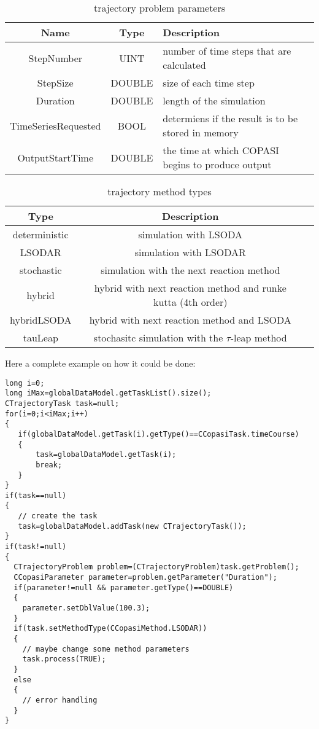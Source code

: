 \documentclass[a4,12pt]{article}
\begin{document}
\begin{table}[ht]
\begin{tabular}{c|c|l}
Name & Type & Description \\ \hline \hline
StepNumber & UINT & number of time steps that are calculated \\ \hline
StepSize & DOUBLE & size of each time step \\ \hline
Duration & DOUBLE & length of the simulation \\ \hline
TimeSeriesRequested & BOOL & determiens if the result is to be stored in memory \\ \hline
OutputStartTime & DOUBLE & the time at which COPASI begins to produce output \\ \hline
\end{tabular}
\label{TrajectoryProblemParameters}
\caption{trajectory problem parameters}
\end{table}

\begin{table}[ht]
\begin{tabular}{c|c|l}
Type &  Description \\ \hline \hline
deterministic  & simulation with LSODA \\ \hline
LSODAR  &  simulation with LSODAR \\ \hline
stochastic &  simulation with the next reaction method \\ \hline
hybrid &  hybrid with next reaction method and runke kutta (4th order)\\ \hline
hybridLSODA & hybrid with next reaction method and LSODA \\ \hline
tauLeap & stochasitc simulation with the $\tau$-leap method \\ \hline
\end{tabular}
\label{TrajectoryMethods}
\caption{trajectory method types}
\end{table}

Here a complete example on how it could be done:

\begin{lstlisting}
long i=0;
long iMax=globalDataModel.getTaskList().size();
CTrajectoryTask task=null;
for(i=0;i<iMax;i++)
{
   if(globalDataModel.getTask(i).getType()==CCopasiTask.timeCourse)
   {
       task=globalDataModel.getTask(i);
       break;
   }
}
if(task==null)
{
   // create the task
   task=globalDataModel.addTask(new CTrajectoryTask());
}
if(task!=null)
{
  CTrajectoryProblem problem=(CTrajectoryProblem)task.getProblem();
  CCopasiParameter parameter=problem.getParameter("Duration");
  if(parameter!=null && parameter.getType()==DOUBLE)
  {
    parameter.setDblValue(100.3);
  }
  if(task.setMethodType(CCopasiMethod.LSODAR))
  {
    // maybe change some method parameters
    task.process(TRUE);
  }
  else
  {
    // error handling
  }
}
\end{lstlisting}
\end{document}
